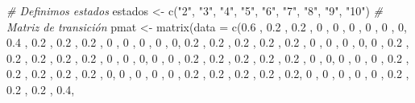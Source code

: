 \documentclass[
]{book}
\newenvironment{Shaded}{\begin{snugshade}}{\end{snugshade}}
\newcommand{\AttributeTok}[1]{\textcolor[rgb]{0.77,0.63,0.00}{#1}}
\newcommand{\CommentTok}[1]{\textcolor[rgb]{0.56,0.35,0.01}{\textit{#1}}}
\newcommand{\DecValTok}[1]{\textcolor[rgb]{0.00,0.00,0.81}{#1}}
\newcommand{\FloatTok}[1]{\textcolor[rgb]{0.00,0.00,0.81}{#1}}
\newcommand{\FunctionTok}[1]{\textcolor[rgb]{0.00,0.00,0.00}{#1}}
\newcommand{\NormalTok}[1]{#1}
\newcommand{\OtherTok}[1]{\textcolor[rgb]{0.56,0.35,0.01}{#1}}
\newcommand{\StringTok}[1]{\textcolor[rgb]{0.31,0.60,0.02}{#1}}
\theoremstyle{definition}
\theoremstyle{definition}
\theoremstyle{definition}
\theoremstyle{definition}
\theoremstyle{remark}
\begin{document}
\begin{Shaded}
\begin{Highlighting}[]
\CommentTok{\# Definimos estados}
\NormalTok{estados }\OtherTok{\textless{}{-}} \FunctionTok{c}\NormalTok{(}\StringTok{"2"}\NormalTok{, }\StringTok{"3"}\NormalTok{, }\StringTok{"4"}\NormalTok{, }\StringTok{"5"}\NormalTok{, }\StringTok{"6"}\NormalTok{, }\StringTok{"7"}\NormalTok{, }\StringTok{"8"}\NormalTok{, }\StringTok{"9"}\NormalTok{, }\StringTok{"10"}\NormalTok{)}
\CommentTok{\# Matriz de transición }
\NormalTok{pmat }\OtherTok{\textless{}{-}} \FunctionTok{matrix}\NormalTok{(}\AttributeTok{data =} \FunctionTok{c}\NormalTok{(}\FloatTok{0.6}\NormalTok{ , }\FloatTok{0.2}\NormalTok{ , }\FloatTok{0.2}\NormalTok{ , }\DecValTok{0}\NormalTok{ , }\DecValTok{0}\NormalTok{ , }\DecValTok{0}\NormalTok{ , }\DecValTok{0}\NormalTok{ , }\DecValTok{0}\NormalTok{ , }\DecValTok{0}\NormalTok{,}
                        \FloatTok{0.4}\NormalTok{ , }\FloatTok{0.2}\NormalTok{ , }\FloatTok{0.2}\NormalTok{ , }\FloatTok{0.2}\NormalTok{ , }\DecValTok{0}\NormalTok{ , }\DecValTok{0}\NormalTok{ , }\DecValTok{0}\NormalTok{ , }\DecValTok{0}\NormalTok{ , }\DecValTok{0}\NormalTok{,}
                        \FloatTok{0.2}\NormalTok{ , }\FloatTok{0.2}\NormalTok{ , }\FloatTok{0.2}\NormalTok{ , }\FloatTok{0.2}\NormalTok{ , }\FloatTok{0.2}\NormalTok{ , }\DecValTok{0}\NormalTok{ , }\DecValTok{0}\NormalTok{ , }\DecValTok{0}\NormalTok{ , }\DecValTok{0}\NormalTok{,}
                        \DecValTok{0}\NormalTok{ , }\FloatTok{0.2}\NormalTok{ , }\FloatTok{0.2}\NormalTok{ , }\FloatTok{0.2}\NormalTok{ , }\FloatTok{0.2}\NormalTok{ , }\FloatTok{0.2}\NormalTok{ , }\DecValTok{0}\NormalTok{ , }\DecValTok{0}\NormalTok{ , }\DecValTok{0}\NormalTok{,}
                        \DecValTok{0}\NormalTok{ , }\DecValTok{0}\NormalTok{ , }\FloatTok{0.2}\NormalTok{ , }\FloatTok{0.2}\NormalTok{ , }\FloatTok{0.2}\NormalTok{ , }\FloatTok{0.2}\NormalTok{ , }\FloatTok{0.2}\NormalTok{ , }\DecValTok{0}\NormalTok{ , }\DecValTok{0}\NormalTok{,}
                        \DecValTok{0}\NormalTok{ , }\DecValTok{0}\NormalTok{ , }\DecValTok{0}\NormalTok{ , }\FloatTok{0.2}\NormalTok{ , }\FloatTok{0.2}\NormalTok{ , }\FloatTok{0.2}\NormalTok{ , }\FloatTok{0.2}\NormalTok{ , }\FloatTok{0.2}\NormalTok{ , }\DecValTok{0}\NormalTok{,}
                        \DecValTok{0}\NormalTok{ , }\DecValTok{0}\NormalTok{ , }\DecValTok{0}\NormalTok{ , }\DecValTok{0}\NormalTok{ , }\FloatTok{0.2}\NormalTok{ , }\FloatTok{0.2}\NormalTok{ , }\FloatTok{0.2}\NormalTok{ , }\FloatTok{0.2}\NormalTok{ , }\FloatTok{0.2}\NormalTok{,}
                        \DecValTok{0}\NormalTok{ , }\DecValTok{0}\NormalTok{ , }\DecValTok{0}\NormalTok{ , }\DecValTok{0}\NormalTok{ , }\DecValTok{0}\NormalTok{ , }\FloatTok{0.2}\NormalTok{ , }\FloatTok{0.2}\NormalTok{ , }\FloatTok{0.2}\NormalTok{ , }\FloatTok{0.4}\NormalTok{,}

\end{Highlighting}
\end{Shaded}
\end{document}
